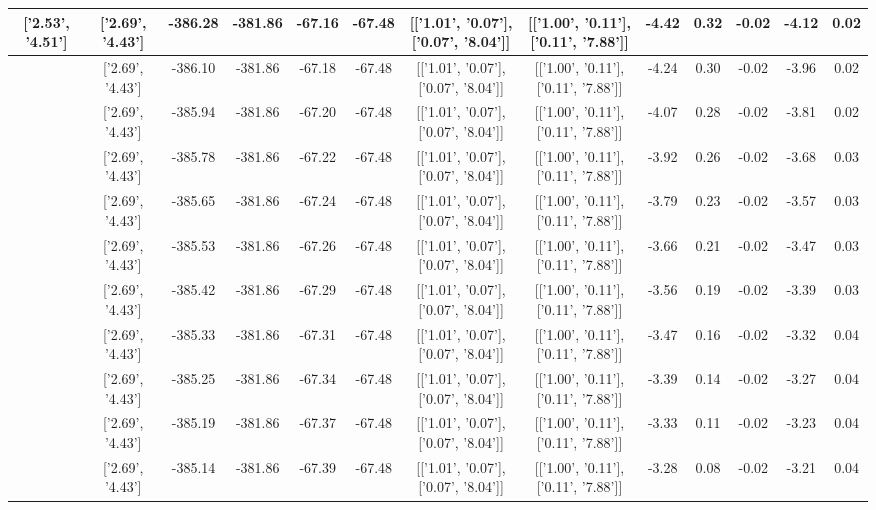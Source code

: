 \begin{table}[htbp]
\begin{adjustbox}{angle=90}
\begin{tabular}{|c|c|c|c|c|c|c|c|c|c|c|c|c|}
 ['2.53', '4.51'] & ['2.69', '4.43'] & -386.28 & -381.86 & -67.16 & -67.48 & [['1.01', '0.07'], ['0.07', '8.04']] & [['1.00', '0.11'], ['0.11', '7.88']] & -4.42 & 0.32 & -0.02 & -4.12 & 0.02\\ \hline
 ['2.54', '4.51'] & ['2.69', '4.43'] & -386.10 & -381.86 & -67.18 & -67.48 & [['1.01', '0.07'], ['0.07', '8.04']] & [['1.00', '0.11'], ['0.11', '7.88']] & -4.24 & 0.30 & -0.02 & -3.96 & 0.02\\ \hline
 ['2.55', '4.50'] & ['2.69', '4.43'] & -385.94 & -381.86 & -67.20 & -67.48 & [['1.01', '0.07'], ['0.07', '8.04']] & [['1.00', '0.11'], ['0.11', '7.88']] & -4.07 & 0.28 & -0.02 & -3.81 & 0.02\\ \hline
 ['2.57', '4.50'] & ['2.69', '4.43'] & -385.78 & -381.86 & -67.22 & -67.48 & [['1.01', '0.07'], ['0.07', '8.04']] & [['1.00', '0.11'], ['0.11', '7.88']] & -3.92 & 0.26 & -0.02 & -3.68 & 0.03\\ \hline
 ['2.58', '4.49'] & ['2.69', '4.43'] & -385.65 & -381.86 & -67.24 & -67.48 & [['1.01', '0.07'], ['0.07', '8.04']] & [['1.00', '0.11'], ['0.11', '7.88']] & -3.79 & 0.23 & -0.02 & -3.57 & 0.03\\ \hline
 ['2.59', '4.48'] & ['2.69', '4.43'] & -385.53 & -381.86 & -67.26 & -67.48 & [['1.01', '0.07'], ['0.07', '8.04']] & [['1.00', '0.11'], ['0.11', '7.88']] & -3.66 & 0.21 & -0.02 & -3.47 & 0.03\\ \hline
 ['2.60', '4.48'] & ['2.69', '4.43'] & -385.42 & -381.86 & -67.29 & -67.48 & [['1.01', '0.07'], ['0.07', '8.04']] & [['1.00', '0.11'], ['0.11', '7.88']] & -3.56 & 0.19 & -0.02 & -3.39 & 0.03\\ \hline
 ['2.62', '4.47'] & ['2.69', '4.43'] & -385.33 & -381.86 & -67.31 & -67.48 & [['1.01', '0.07'], ['0.07', '8.04']] & [['1.00', '0.11'], ['0.11', '7.88']] & -3.47 & 0.16 & -0.02 & -3.32 & 0.04\\ \hline
 ['2.63', '4.46'] & ['2.69', '4.43'] & -385.25 & -381.86 & -67.34 & -67.48 & [['1.01', '0.07'], ['0.07', '8.04']] & [['1.00', '0.11'], ['0.11', '7.88']] & -3.39 & 0.14 & -0.02 & -3.27 & 0.04\\ \hline
 ['2.64', '4.46'] & ['2.69', '4.43'] & -385.19 & -381.86 & -67.37 & -67.48 & [['1.01', '0.07'], ['0.07', '8.04']] & [['1.00', '0.11'], ['0.11', '7.88']] & -3.33 & 0.11 & -0.02 & -3.23 & 0.04\\ \hline
 ['2.65', '4.45'] & ['2.69', '4.43'] & -385.14 & -381.86 & -67.39 & -67.48 & [['1.01', '0.07'], ['0.07', '8.04']] & [['1.00', '0.11'], ['0.11', '7.88']] & -3.28 & 0.08 & -0.02 & -3.21 & 0.04\\ \hline

\end{tabular}
\end{adjustbox}
\end{table}
